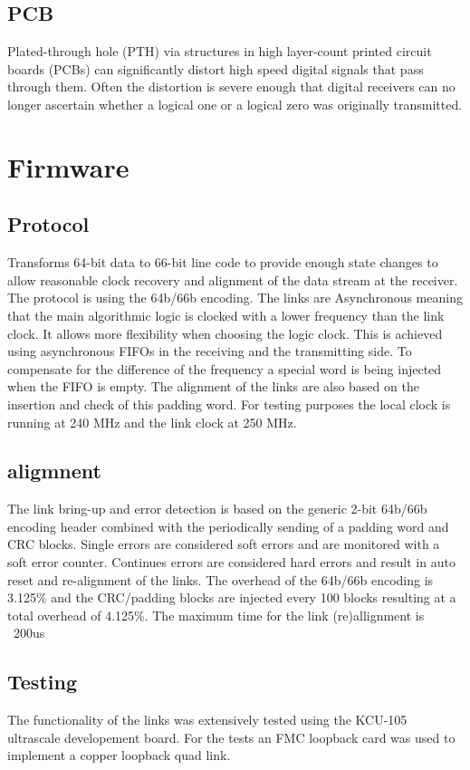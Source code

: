 \documentclass[a4paper]{PoS}
\begin{document}
\subsection{PCB}
Plated-through hole (PTH) via structures in high layer-count printed circuit boards (PCBs) can significantly distort high speed digital signals that pass through them. Often the  distortion is severe enough that digital receivers can no longer ascertain whether a  logical one or a logical zero was originally transmitted. 


\section{Firmware}


\subsection{Protocol}
Transforms 64-bit data to 66-bit line code to provide enough state changes to allow reasonable clock recovery and alignment of the data stream at the receiver.
The protocol is using the 64b/66b encoding. The links are Asynchronous meaning that the main algorithmic logic is clocked with a lower frequency than the link clock. It allows more flexibility when choosing the logic clock. This is achieved using asynchronous FIFOs in the receiving and the transmitting side. To compensate for the difference of the frequency a special word is being injected when the FIFO is empty. The alignment of the links are also based on the insertion and check of this padding word. For testing purposes the local clock is running at 240 MHz and the link clock at 250 MHz.


\subsection{aligmnent}
The link bring-up and error detection is based on the generic 2-bit 64b/66b encoding header combined with the periodically sending of a padding word and CRC blocks.
Single errors are considered soft errors and are monitored with a soft error counter.
Continues errors are considered hard errors and result in auto reset and re-alignment of the links. 
The overhead of the 64b/66b encoding is 3.125\% and the CRC/padding blocks are injected every 100 blocks resulting at a total overhead of 4.125\%.
The maximum time for the link (re)allignment is ~200us


\subsection*{Testing}
The functionality of the links was extensively tested using the KCU-105 ultrascale developement board. For the tests an FMC loopback card was used to implement a copper loopback quad link.
\end{document}
